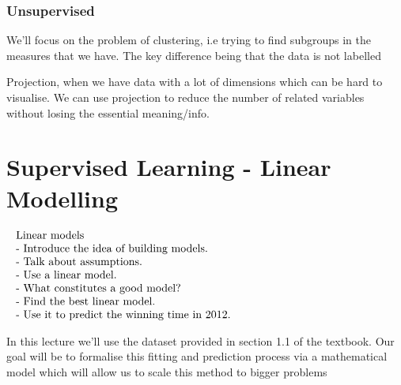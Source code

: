 
	\subsubsection{Unsupervised}


		\par{We'll focus on the problem of clustering, i.e trying to find subgroups in the measures that we have. The key difference being that the data is not labelled}



		\par{Projection, when we have data with a lot of dimensions which can be hard to visualise. We can use projection to reduce the number of related variables without losing the essential meaning/info.}



\section{Supervised Learning - Linear Modelling}


	$\begin{array}{l}\text { Linear models } \\ \text { - Introduce the idea of building models. } \\ \text { - Talk about assumptions. } \\ \text { - Use a linear model. } \\ \text { - What constitutes a good model? } \\ \text { - Find the best linear model. } \\ \text { - Use it to predict the winning time in 2012. }\end{array}\\$

	\par{In this lecture we'll use the dataset provided in section 1.1 of the textbook. Our goal will be to formalise this fitting and prediction process via a mathematical model which will allow us to scale this method to bigger problems}



